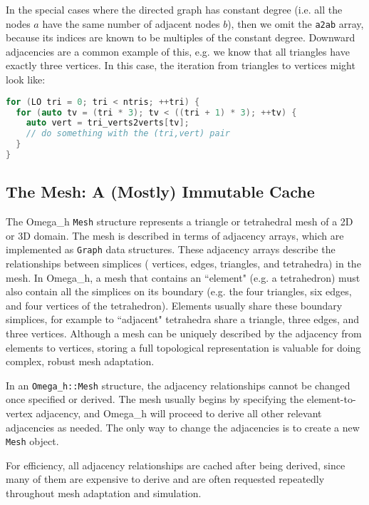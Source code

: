 \documentclass{article}
\begin{document}
In the special cases where the directed graph has constant degree (i.e. all the
nodes $a$ have the same number of adjacent nodes $b$),
then we omit the \texttt{a2ab} array, because its indices are known to
be multiples of the constant degree.
Downward adjacencies are a common example of this, e.g. we know that all triangles
have exactly three vertices.
In this case, the iteration from triangles to vertices might look like:

\begin{lstlisting}[language=c++]
for (LO tri = 0; tri < ntris; ++tri) {
  for (auto tv = (tri * 3); tv < ((tri + 1) * 3); ++tv) {
    auto vert = tri_verts2verts[tv];
    // do something with the (tri,vert) pair
  }
}
\end{lstlisting}

\subsection{The Mesh: A (Mostly) Immutable Cache}

The Omega\_h \texttt{Mesh} structure represents a triangle or tetrahedral
mesh of a 2D or 3D domain.
The mesh is described in terms of adjacency arrays, which are implemented as
\texttt{Graph} data structures.
These adjacency arrays describe the relationships between simplices (
vertices, edges, triangles, and tetrahedra) in the mesh.
In Omega\_h, a mesh that contains an ``element" (e.g. a tetrahedron)
must also contain all the simplices on its boundary
(e.g. the four triangles, six edges, and four vertices of the tetrahedron).
Elements usually share these boundary simplices, for example to ``adjacent"
tetrahedra share a triangle, three edges, and three vertices.
Although a mesh can be uniquely described by the adjacency from elements
to vertices, storing a full topological representation is
valuable for doing complex, robust mesh adaptation.

In an \texttt{Omega\_h::Mesh} structure, the adjacency relationships
cannot be changed once specified or derived.
The mesh usually begins by specifying the element-to-vertex adjacency,
and Omega\_h will proceed to derive all other relevant adjacencies as
needed.
The only way to change the adjacencies is to create a new \texttt{Mesh}
object.

For efficiency, all adjacency relationships are cached after being derived,
since many of them are expensive to derive and are often requested repeatedly
throughout mesh adaptation and simulation.
\end{document}
